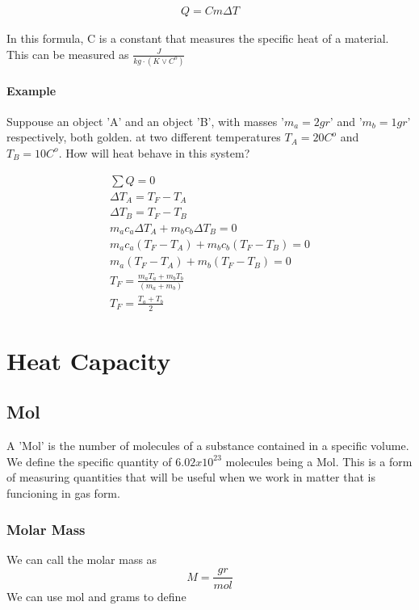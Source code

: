 \documentclass[11pt,fleqn]{book} %
\begin{document}
\begin{gather}
    Q = Cm\Delta T
\end{gather}

In this formula, C is a constant that measures the specific heat of a material. This can be measured as
$\frac{J}{kg \cdot (K\lor C^o)}$

\paragraph*{Example}

Suppouse an object 'A' and an object 'B', with masses '$m_a = 2gr$' and '$m_b = 1 gr$' respectively, both 
golden. at two different temperatures $T_A = 20C^o$ and $T_B = 10C^o$. How will heat behave in this system?

\begin{gather}
    \sum Q = 0\\
    \Delta T_A = T_F - T_A\\
    \Delta T_B = T_F - T_B\\ 
    m_a c_a \Delta T_A + m_b c_b \Delta T_B = 0\\
    m_a c_a (T_F - T_A) + m_b c_b (T_F - T_B) = 0\\
    m_a (T_F - T_A) + m_b (T_F - T_B) = 0\\ 
    T_F = \frac{m_a T_a + m_b T_b}{(m_a + m_b)}\\
    T_F = \frac{T_a + T_b}{2}
\end{gather}

\section{Heat Capacity}

\subsection{Mol}

A 'Mol' is the number of molecules of a substance contained in a specific 
volume. We define the specific quantity of $6.02x10^{23}$ molecules being
a Mol. This is a form of measuring quantities that will be useful when we work in
matter that is funcioning in gas form.

\subsubsection{Molar Mass}
We can call the molar mass as $$M = \frac{gr}{mol}$$ 
We can use mol and grams to define 
\end{document}
